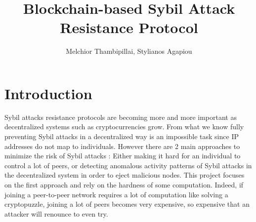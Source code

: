 \documentclass[twocolumn]{article}
\begin{document}
\title{Blockchain-based Sybil Attack Resistance Protocol} 

\author{Melchior Thambipillai, Stylianos Agapiou}

\maketitle

\section{Introduction}

Sybil attacks resistance protocols are becoming more and more important as decentralized systems such as cryptocurrencies grow. From what we know fully preventing Sybil attacks in a decentralized way is an impossible task since IP addresses do not map to individuals. However there are 2 main approaches to minimize the risk of Sybil attacks : Either making it hard for an individual to control a lot of peers, or detecting anomalous activity patterns of Sybil attacks in the decentralized system in order to eject malicious nodes. This project focuses on the first approach and rely on the hardness of some computation. Indeed, if joining a peer-to-peer network requires a lot of computation like solving a cryptopuzzle, joining a lot of peers becomes very expensive, so expensive that an attacker will renounce to even try.
\end{document}
